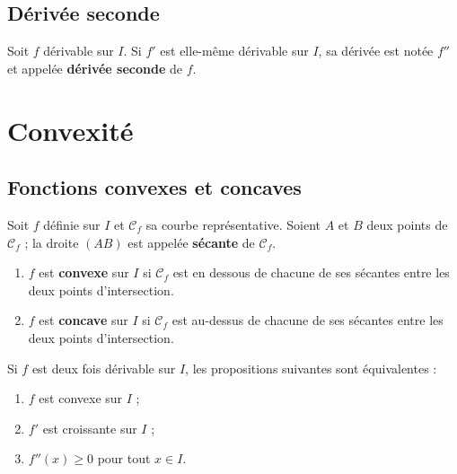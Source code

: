 \documentclass[11pt,a4paper,openany]{book}
\theoremstyle{definition}
\begin{document}
    \subsection{Dérivée seconde}
    \begin{Définition}
        Soit $f$ dérivable sur $I$. Si $f'$ est elle-même dérivable sur $I$, sa dérivée est
        notée $f''$ et appelée \textbf{dérivée seconde} de $f$.
    \end{Définition}

    \section{Convexité}
    \subsection{Fonctions convexes et concaves}
    \begin{Définition}
        Soit $f$ définie sur $I$ et $\mathcal{C}_f$ sa courbe représentative. Soient $A$ et
        $B$ deux points de $\mathcal{C}_f$ ; la droite $(AB)$ est appelée \textbf{sécante}
        de $\mathcal{C}_f$.
    \end{Définition}

    \begin{Définition}
        \begin{enumerate}
            \item $f$ est \textbf{convexe} sur $I$ si $\mathcal{C}_f$ est en dessous de
                  chacune de ses sécantes entre les deux points d'intersection.
            \item $f$ est \textbf{concave} sur $I$ si $\mathcal{C}_f$ est au-dessus de
                  chacune de ses sécantes entre les deux points d'intersection.
        \end{enumerate}
    \end{Définition}

    \begin{Propriété}
        Si $f$ est deux fois dérivable sur $I$, les propositions suivantes sont équivalentes :
        \begin{enumerate}
            \item $f$ est convexe sur $I$ ;
            \item $f'$ est croissante sur $I$ ;
            \item $f''(x)\geq 0$ pour tout $x\in I$.
        \end{enumerate}
    \end{Propriété}
\end{document}
